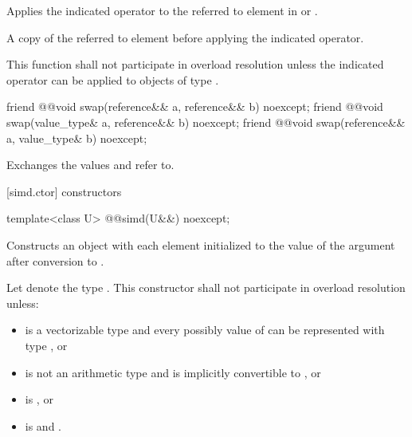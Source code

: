 \begin{itemdescr}
  \pnum\effects
  Applies the indicated operator to the referred to element in  or .

  \pnum\returns
  A copy of the referred to element before applying the indicated operator.

  \pnum\remarks
  This function shall not participate in overload resolution unless the indicated operator can be applied to objects of type .
\end{itemdescr}

\begin{itemdecl}
friend @@void swap(reference&& a, reference&& b) noexcept;
friend @@void swap(value_type& a, reference&& b) noexcept;
friend @@void swap(reference&& a, value_type& b) noexcept;
\end{itemdecl}

\begin{itemdescr}
  \pnum\effects
  Exchanges the values  and  refer to.
\end{itemdescr}

[simd.ctor]{ constructors}

\begin{itemdecl}
template<class U> @@simd(U&&) noexcept;
\end{itemdecl}

\begin{itemdescr}
  \pnum\effects
  Constructs an object with each element initialized to the value of the argument after conversion to .

  \pnum\remarks
  Let  denote the type . This constructor shall not participate in overload resolution unless:
  \begin{itemize}
    \item {} is a vectorizable type and every possibly value of  can be represented with type , or
    \item {} is not an arithmetic type and is implicitly convertible to , or
    \item {} is , or
    \item {} is  and .%
  \end{itemize}

\end{itemdescr}

